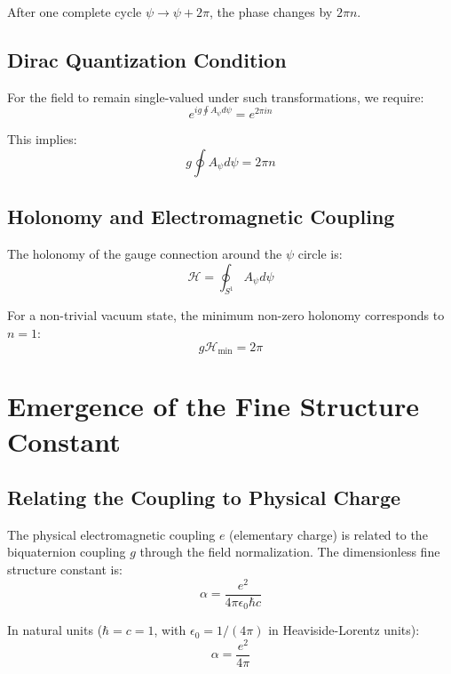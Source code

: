\documentclass[12pt, a4paper]{article}
\theoremstyle{definition}
\theoremstyle{remark}
\begin{document}
After one complete cycle $\psi \to \psi + 2\pi$, the phase changes by $2\pi n$.

\subsection{Dirac Quantization Condition}

For the field to remain single-valued under such transformations, we require:
\begin{equation}
e^{ig \oint A_\psi d\psi} = e^{2\pi i n}
\end{equation}

This implies:
\begin{equation}
g \oint A_\psi d\psi = 2\pi n
\label{eq:quant}
\end{equation}

\subsection{Holonomy and Electromagnetic Coupling}

The holonomy of the gauge connection around the $\psi$ circle is:
\begin{equation}
\mathcal{H} = \oint_{S^1} A_\psi d\psi
\end{equation}

For a non-trivial vacuum state, the minimum non-zero holonomy corresponds to $n=1$:
\begin{equation}
g \mathcal{H}_{\text{min}} = 2\pi
\end{equation}

\section{Emergence of the Fine Structure Constant}

\subsection{Relating the Coupling to Physical Charge}

The physical electromagnetic coupling $e$ (elementary charge) is related to the biquaternion coupling $g$ through the field normalization. The dimensionless fine structure constant is:
\begin{equation}
\alpha = \frac{e^2}{4\pi\epsilon_0\hbar c}
\end{equation}

In natural units ($\hbar = c = 1$, with $\epsilon_0 = 1/(4\pi)$ in Heaviside-Lorentz units):
\begin{equation}
\alpha = \frac{e^2}{4\pi}
\end{equation}
\end{document}
